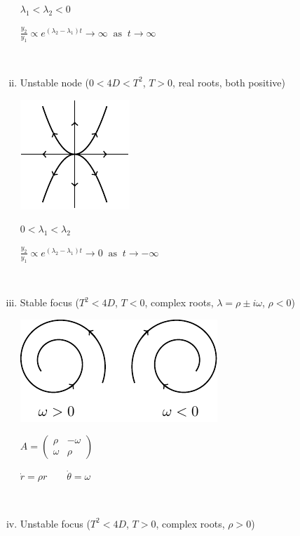 \documentclass{article}
\begin{document}
\begin{enumerate}[(i)]
\begin{minipage}[c][0.25\textwidth][c]{0.25\textwidth}
\end{minipage}
\begin{minipage}[c][0.25\textwidth][c]{0.25\textwidth}
 $ \lambda_1 < \lambda_2 < 0 $
\end{minipage}
\begin{minipage}[c][0.25\textwidth][c]{0.35\textwidth}
$ \frac{y_2}{y_1} \propto 
e^{(\lambda_2-\lambda_1)t} \to \infty \;\; \mbox{as} \;\; t \to \infty $
\end{minipage}
\\
\item Unstable node ($0 < 4D < T^2$, $T>0$, real roots, both positive)
\\
\begin{minipage}[c][0.25\textwidth][c]{0.25\textwidth}
\includegraphics{Fig8.pdf}
\end{minipage}
\begin{minipage}[c][0.25\textwidth][c]{0.25\textwidth}
 $ 0<\lambda_1 < \lambda_2 $
\end{minipage}
\begin{minipage}[c][0.25\textwidth][c]{0.35\textwidth}
$ \frac{y_2}{y_1} \propto 
e^{(\lambda_2-\lambda_1)t} \to 0\;\; \mbox{as} \;\; t \to -\infty $
\end{minipage}
\\
%
\item Stable focus ($ T^2 < 4D $, $T<0$, complex roots, 
$\lambda = \rho \pm i \omega$, $\rho < 0$)
\\
\begin{minipage}[c][0.25\textwidth][c]{0.35\textwidth}
\includegraphics{Fig9.pdf}
\end{minipage}
\begin{minipage}[c][0.25\textwidth][c]{0.25\textwidth}
$  A = \left( \begin{array}{cc}
		\rho & -\omega \\
		 \omega & \rho \end{array} \right) $
\end{minipage}
\begin{minipage}[c][0.25\textwidth][c]{0.35\textwidth}
$ \dot{r} = \rho r \qquad \dot{\theta} = \omega $
\end{minipage}
\\
\item Unstable focus ($ T^2 < 4D $, $T>0$, complex roots, $\rho > 0$)


\end{enumerate}
\end{document}
